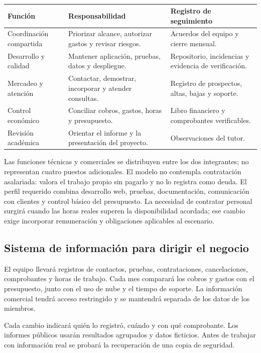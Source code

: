 \begin{table}[htbp]
\caption{Organización funcional propuesta}
\begin{tabularx}{\textwidth}{p{3.2cm}X X}
\toprule Función & Responsabilidad & Registro de seguimiento \\
\midrule
Coordinación compartida & Priorizar alcance, autorizar gastos y revisar riesgos. & Acuerdos del equipo y cierre mensual. \\
Desarrollo y calidad & Mantener aplicación, pruebas, datos y despliegue. & Repositorio, incidencias y evidencia de verificación. \\
Mercadeo y atención & Contactar, demostrar, incorporar y atender consultas. & Registro de prospectos, altas, bajas y soporte. \\
Control económico & Conciliar cobros, gastos, horas y presupuesto. & Libro financiero y comprobantes verificables. \\
Revisión académica & Orientar el informe y la presentación del proyecto. & Observaciones del tutor. \\
\bottomrule
\end{tabularx}
\caption*{\fuentepropia}
\end{table}

Las funciones técnicas y comerciales se distribuyen entre los dos integrantes;
no representan cuatro puestos adicionales. El modelo no contempla contratación
asalariada: valora el trabajo propio sin pagarlo y no lo registra como deuda.
El perfil requerido combina desarrollo web, pruebas, documentación, comunicación
con clientes y control básico del presupuesto. La necesidad de contratar
personal surgirá cuando las horas reales superen la disponibilidad acordada;
ese cambio exige incorporar remuneración y obligaciones aplicables al escenario.

\subsection{Sistema de información para dirigir el negocio}

El equipo llevará registros de contactos, pruebas, contrataciones,
cancelaciones, comprobantes y horas de trabajo. Cada mes comparará los cobros
y gastos con el presupuesto, junto con el uso de nube y el tiempo de soporte.
La información comercial tendrá acceso restringido y se mantendrá separada
de los datos de los miembros.

Cada cambio indicará quién lo registró, cuándo y con qué comprobante.
Los informes públicos usarán resultados agrupados y datos ficticios. Antes de
trabajar con información real se probará la recuperación de una copia de
seguridad.

